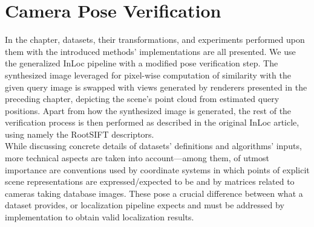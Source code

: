\chapter{Camera Pose Verification} \label{chap:pose_verification}

In the chapter, datasets, their transformations, and experiments performed upon them with
the introduced methods' implementations are all presented. We use the generalized InLoc
pipeline with a modified pose verification step. The synthesized image leveraged for
pixel-wise computation of similarity with the given query image is swapped with views
generated by renderers presented in the preceding chapter, depicting the scene's point
cloud from estimated query positions. Apart from how the synthesized image is generated,
the rest of the verification process is then performed as described in the original InLoc article,
using namely the RootSIFT descriptors.\\

While discussing concrete details of datasets' definitions and algorithms' inputs, more
technical aspects are taken into account---among them, of utmost importance are
conventions used by coordinate systems in which points of explicit scene representations
are expressed/expected to be and by matrices related to cameras taking database images.
These pose a crucial difference between what a dataset provides, or localization pipeline
expects and must be addressed by implementation to obtain valid localization results.


